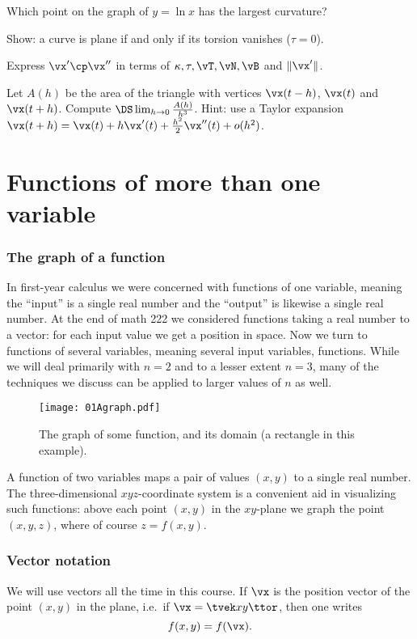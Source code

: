 \subprob Which point on the graph of $y=\ln x$ has the largest
curvature?


\problem Show: a curve is plane if and only if its torsion vanishes%
($\tau = 0$).

\problem Express $\vx'\cp\vx''$ in terms of $\kappa, \tau, \vT, \vN,%
\vB$ and $\|\vx'\|$.

\problem Let $A(h)$ be the area of the triangle with vertices%
$\vx(t-h)$, $\vx(t)$ and $\vx(t+h)$.  Compute $\DS \lim_{h\to 0}
\frac{A(h)}{h^3}$.  Hint: use a Taylor expansion $\vx(t+h) = \vx(t) +
h\vx'(t) + \frac{h^2}{2}\vx''(t) + o(h^2)$.

\noproblemfont

\chapter{Functions of more than one variable} %

\subsection{The graph of a function} %
In first-year calculus we were concerned with functions of one
variable, meaning the ``input'' is a single real number and the
``output'' is likewise a single real number. At the end of math 222 we
considered functions taking a real number to a vector: for each input
value we get a position in space. Now we turn to functions of several
variables, meaning several input variables, functions.
While we will deal primarily with $n=2$ and to a lesser
extent $n=3$, many of the techniques we discuss can be applied
to larger values of $n$ as well.

\begin{figure}[h]
  \begin{center}
    \texttt{[image: 01Agraph.pdf]}
  \end{center}
  \caption{The graph of some function, and its domain (a rectangle in
  this example).}
  \label{fig:01Agraph}
\end{figure}

A function of two variables maps a pair of values $(x,y)$ to a
single real number.  The three-dimensional $xyz$-coordinate system
is a convenient aid in visualizing such functions: above
each point $(x,y)$ in the $xy$-plane we graph the point $(x,y,z)$,
where of course $z=f(x,y)$.

\subsection{Vector notation} We will use vectors all the time in this %
course.  If $\vx$ is the position vector of the point $(x, y)$ in the
plane, i.e.\ if $\vx = \tvek x\\ y\ttor$, then one writes
\[
f(x, y)  = f(\vx).
\]

